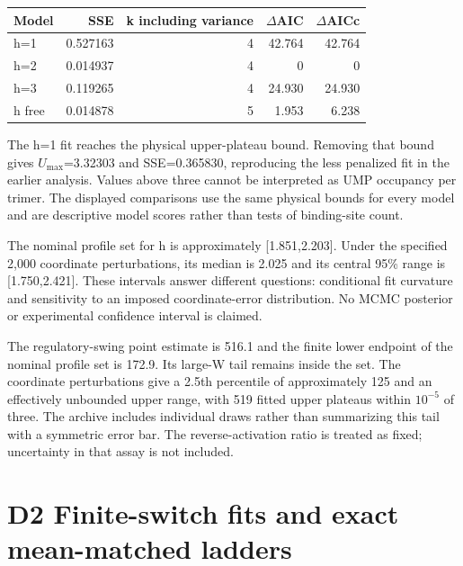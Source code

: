 \documentclass[11pt]{article}
\begin{document}
\begin{center}\begin{singlespace}\small
\begin{tabular}{lrrrr}\toprule

Model & SSE & k including variance & $\Delta$AIC & $\Delta$AICc \\
\midrule

h=1 & 0.527163 & 4 & 42.764 & 42.764 \\

h=2 & 0.014937 & 4 & 0 & 0 \\

h=3 & 0.119265 & 4 & 24.930 & 24.930 \\

h free & 0.014878 & 5 & 1.953 & 6.238 \\

\bottomrule\end{tabular}
\end{singlespace}\end{center}

The h=1 fit reaches the physical upper-plateau bound. Removing that bound gives $U_{\max}$=3.32303 and SSE=0.365830, reproducing the less penalized fit in the earlier analysis. Values above three cannot be interpreted as UMP occupancy per trimer. The displayed comparisons use the same physical bounds for every model and are descriptive model scores rather than tests of binding-site count.


The nominal profile set for h is approximately [1.851,2.203]. Under the specified 2,000 coordinate perturbations, its median is 2.025 and its central 95\% range is [1.750,2.421]. These intervals answer different questions: conditional fit curvature and sensitivity to an imposed coordinate-error distribution. No MCMC posterior or experimental confidence interval is claimed.


The regulatory-swing point estimate is 516.1 and the finite lower endpoint of the nominal profile set is 172.9. Its large-W tail remains inside the set. The coordinate perturbations give a 2.5th percentile of approximately 125 and an effectively unbounded upper range, with 519 fitted upper plateaus within $10^{-5}$ of three. The archive includes individual draws rather than summarizing this tail with a symmetric error bar. The reverse-activation ratio is treated as fixed; uncertainty in that assay is not included.


\section*{D2 Finite-switch fits and exact mean-matched ladders}
\end{document}
